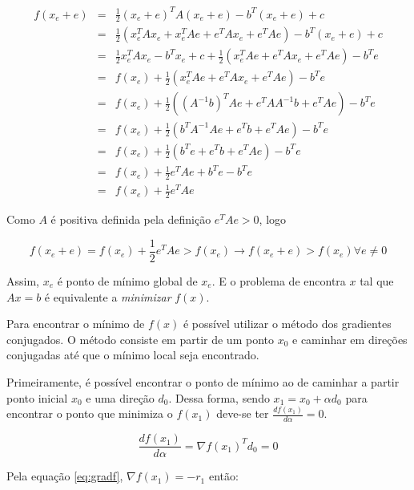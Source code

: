 \begin{eqnarray}
     f(x_e + e) & = & \frac{1}{2} (x_e + e)^T A (x_e + e) - b^T(x_e + e) + c \\
                & = & \frac{1}{2} (x_e^TAx_e + x_e^TAe + e^TAx_e + e^TAe )- b^T(x_e + e) + c \\
                & = & \frac{1}{2} x_e^TAx_e -b^Tx_e + c + \frac{1}{2} ( x_e^TAe + e^TAx_e + e^TAe ) - b^Te \\
                & = & f(x_e) + \frac{1}{2} ( x_e^TAe + e^TAx_e + e^TAe ) - b^Te \\
                & = & f(x_e) + \frac{1}{2} ( (A^{-1}b)^TAe + e^TAA^{-1}b + e^TAe ) - b^Te \\
                & = & f(x_e) + \frac{1}{2} ( b^TA^{-1}Ae + e^Tb + e^TAe ) - b^Te \\
                & = & f(x_e) + \frac{1}{2} ( b^Te + e^Tb + e^TAe ) - b^Te \\
                & = & f(x_e) + \frac{1}{2}  e^TAe  + b^Te - b^Te \\
                & = & f(x_e) + \frac{1}{2}  e^TAe 
\end{eqnarray}


Como $A$ é positiva definida pela definição $e^TAe  > 0$, logo

\begin{equation}
    f(x_e + e) = f(x_e) + \frac{1}{2}  e^TAe > f(x_e)\rightarrow  f(x_e + e) > f(x_e) \forall e \neq 0
\end{equation}


Assim, $x_e$ é ponto de mínimo global de $x_e$. E o problema de encontra $x$ tal que $Ax = b$ é equivalente a \textit{minimizar} $f(x)$.

Para encontrar o mínimo de $f(x)$ é possível utilizar o método dos gradientes conjugados. O método consiste em partir de um ponto $x_0$ e caminhar em direções conjugadas até que o mínimo local seja encontrado.

Primeiramente, é possível encontrar o ponto de mínimo ao de caminhar a partir ponto inicial $x_0$ e uma direção $d_0$. Dessa forma, sendo $x_1 = x_0 + \alpha d_0$ para encontrar o ponto que minimiza o $f(x_1)$ deve-se ter $\frac{d f(x_1)}{d\alpha} = 0$.

\begin{equation}
    \frac{df(x_1)}{d \alpha} =  \nabla f(x_1)^T d_0 = 0
\end{equation}

Pela equação \ref{eq:gradf}, $\nabla f(x_1) = -r_1 $ então:


